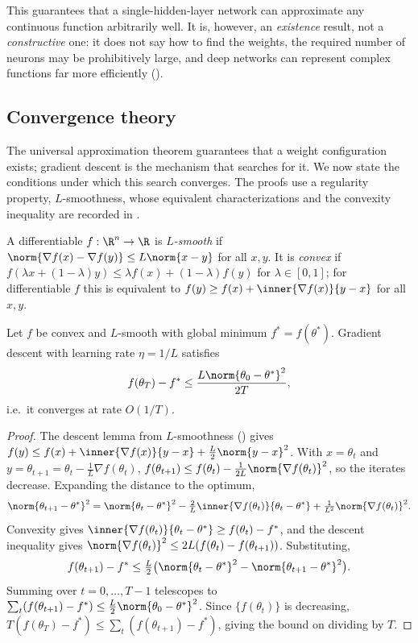 This guarantees that a single-hidden-layer network can approximate any continuous
function arbitrarily well. It is, however, an \emph{existence} result, not a
\emph{constructive} one: it does not say how to find the weights, the required
number of neurons may be prohibitively large, and deep networks can represent
complex functions far more efficiently ().

\subsection{Convergence theory}
\label{sec:found:convergence}

The universal approximation theorem guarantees that a weight configuration
exists; gradient descent is the mechanism that searches for it. We now state the
conditions under which this search converges. The proofs use a regularity
property, $L$-smoothness, whose equivalent characterizations and the convexity
inequality are recorded in .

\begin{definition}
\label{def:found:smooth}
A differentiable $f : \R^n \to \R$ is \emph{$L$-smooth} if
$\norm{\nabla f(x) - \nabla f(y)} \le L\norm{x - y}$ for all $x, y$. It is
\emph{convex} if $f(\lambda x + (1-\lambda)y) \le \lambda f(x) + (1-\lambda)f(y)$
for $\lambda \in [0,1]$; for differentiable $f$ this is equivalent to
$f(y) \ge f(x) + \inner{\nabla f(x)}{y - x}$ for all $x, y$.
\end{definition}

\begin{theorem}
\label{thm:found:gd-convex}
Let $f$ be convex and $L$-smooth with global minimum $f^* = f(\theta^*)$.
Gradient descent with learning rate $\eta = 1/L$ satisfies
\[
  f(\theta_T) - f^* \le \frac{L\norm{\theta_0 - \theta^*}^2}{2T},
\]
i.e.\ it converges at rate $O(1/T)$.
\end{theorem}

\begin{proof}
The descent lemma from $L$-smoothness () gives
$f(y) \le f(x) + \inner{\nabla f(x)}{y - x} + \frac{L}{2}\norm{y - x}^2$. With
$x = \theta_t$ and $y = \theta_{t+1} = \theta_t - \frac{1}{L}\nabla f(\theta_t)$,
$f(\theta_{t+1}) \le f(\theta_t) - \frac{1}{2L}\norm{\nabla f(\theta_t)}^2$, so
the iterates decrease. Expanding the distance to the optimum,
\[
  \norm{\theta_{t+1} - \theta^*}^2 = \norm{\theta_t - \theta^*}^2
  - \tfrac{2}{L}\inner{\nabla f(\theta_t)}{\theta_t - \theta^*}
  + \tfrac{1}{L^2}\norm{\nabla f(\theta_t)}^2.
\]
Convexity gives $\inner{\nabla f(\theta_t)}{\theta_t - \theta^*} \ge f(\theta_t)
- f^*$, and the descent inequality gives
$\norm{\nabla f(\theta_t)}^2 \le 2L(f(\theta_t) - f(\theta_{t+1}))$. Substituting,
\[
  f(\theta_{t+1}) - f^* \le \tfrac{L}{2}\bigl(\norm{\theta_t - \theta^*}^2
  - \norm{\theta_{t+1} - \theta^*}^2\bigr).
\]
Summing over $t = 0, \ldots, T-1$ telescopes to
$\sum_t (f(\theta_{t+1}) - f^*) \le \frac{L}{2}\norm{\theta_0 - \theta^*}^2$.
Since $\{f(\theta_t)\}$ is decreasing, $T(f(\theta_T) - f^*) \le \sum_t
(f(\theta_{t+1}) - f^*)$, giving the bound on dividing by $T$.
\end{proof}

